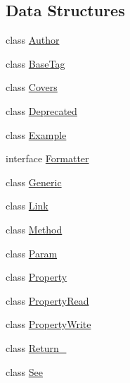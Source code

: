 \subsection*{Data Structures}
\begin{DoxyCompactItemize}
\item 
class \mbox{\hyperlink{classphp_documentor_1_1_reflection_1_1_doc_block_1_1_tags_1_1_author}{Author}}
\item 
class \mbox{\hyperlink{classphp_documentor_1_1_reflection_1_1_doc_block_1_1_tags_1_1_base_tag}{Base\+Tag}}
\item 
class \mbox{\hyperlink{classphp_documentor_1_1_reflection_1_1_doc_block_1_1_tags_1_1_covers}{Covers}}
\item 
class \mbox{\hyperlink{classphp_documentor_1_1_reflection_1_1_doc_block_1_1_tags_1_1_deprecated}{Deprecated}}
\item 
class \mbox{\hyperlink{classphp_documentor_1_1_reflection_1_1_doc_block_1_1_tags_1_1_example}{Example}}
\item 
interface \mbox{\hyperlink{interfacephp_documentor_1_1_reflection_1_1_doc_block_1_1_tags_1_1_formatter}{Formatter}}
\item 
class \mbox{\hyperlink{classphp_documentor_1_1_reflection_1_1_doc_block_1_1_tags_1_1_generic}{Generic}}
\item 
class \mbox{\hyperlink{classphp_documentor_1_1_reflection_1_1_doc_block_1_1_tags_1_1_link}{Link}}
\item 
class \mbox{\hyperlink{classphp_documentor_1_1_reflection_1_1_doc_block_1_1_tags_1_1_method}{Method}}
\item 
class \mbox{\hyperlink{classphp_documentor_1_1_reflection_1_1_doc_block_1_1_tags_1_1_param}{Param}}
\item 
class \mbox{\hyperlink{classphp_documentor_1_1_reflection_1_1_doc_block_1_1_tags_1_1_property}{Property}}
\item 
class \mbox{\hyperlink{classphp_documentor_1_1_reflection_1_1_doc_block_1_1_tags_1_1_property_read}{Property\+Read}}
\item 
class \mbox{\hyperlink{classphp_documentor_1_1_reflection_1_1_doc_block_1_1_tags_1_1_property_write}{Property\+Write}}
\item 
class \mbox{\hyperlink{classphp_documentor_1_1_reflection_1_1_doc_block_1_1_tags_1_1_return__}{Return\+\_\+}}
\item 
class \mbox{\hyperlink{classphp_documentor_1_1_reflection_1_1_doc_block_1_1_tags_1_1_see}{See}}
\item 

\end{DoxyCompactItemize}
